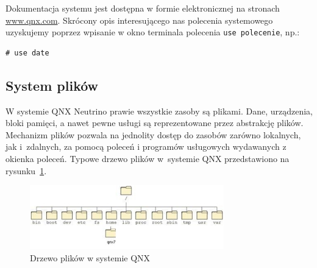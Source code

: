 \begin{example}\label{ex:prostakomenda9} 

Dokumentacja systemu jest dostępna w formie elektronicznej na stronach \href{www.qnx.com}{www.qnx.com}. Skrócony opis interesującego nas polecenia systemowego uzyskujemy poprzez wpisanie w okno terminala polecenia \lstinline[style=MyBashStyle]{use polecenie}, np.:

\begin{lstlisting}[style=MyBashStyle]
# use date
\end{lstlisting}
\end{example}

\subsection{System plików} 

W systemie QNX Neutrino prawie wszystkie zasoby są plikami. Dane, urządzenia, bloki pamięci, a nawet pewne usługi są reprezentowane przez abstrakcję plików. Mechanizm plików pozwala na jednolity dostęp do zasobów zarówno lokalnych, jak i~zdalnych, za pomocą poleceń i programów usługowych wydawanych z okienka poleceń. Typowe drzewo plików w~systemie QNX przedstawiono na rysunku~\ref{fig:drzewo}. 

\begin{figure}[!h]
\centering
\includegraphics[width=0.75\textwidth]{img/systemplikow}
\caption{Drzewo plików w systemie QNX}
\label{fig:drzewo}
\end{figure}

